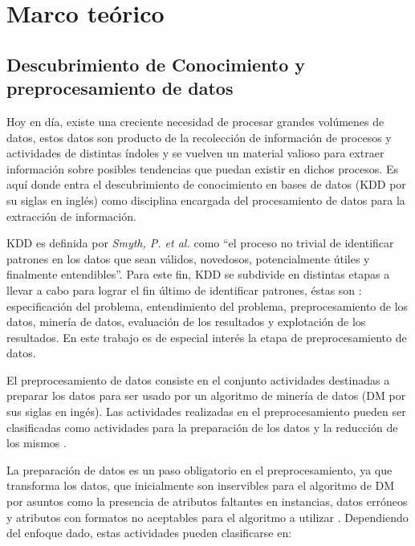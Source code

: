 \chapter{Marco teórico}
\label{capitulo1}

\section{Descubrimiento de Conocimiento y preprocesamiento de datos}

Hoy en día, existe una creciente necesidad de procesar grandes volúmenes de datos, estos datos son producto de la recolección de información de procesos y actividades de distintas índoles y se vuelven un material valioso para extraer información sobre posibles tendencias que puedan existir en dichos procesos. Es aquí donde entra el descubrimiento de conocimiento en bases de datos (KDD por su siglas en inglés) como disciplina encargada del procesamiento de datos para la extracción de información.

KDD es definida por \emph{Smyth, P. et al.} \cite{fayyd1996data} como ``el proceso no trivial de identificar patrones en los datos que sean válidos, novedosos, potencialmente útiles y finalmente entendibles''. Para este fin, KDD se subdivide en distintas etapas a llevar a cabo para lograr el fin último de identificar patrones, éstas son \cite{garcia2016data}: especificación del problema, entendimiento del problema, preprocesamiento de los datos, minería de datos, evaluación de los resultados y explotación de los resultados. En este trabajo es de especial interés la etapa de preprocesamiento de datos.

El preprocesamiento de datos consiste en el conjunto actividades destinadas a preparar los datos para ser usado por un algoritmo de minería de datos (DM por sus siglas en ingés). Las actividades realizadas en el preprocesamiento pueden ser clasificadas como actividades para la preparación de los datos y la reducción de los mismos \cite{garcia2016data}.

La preparación de datos es un paso obligatorio en el preprocesamiento, ya que transforma los datos, que inicialmente son inservibles para el algoritmo de DM por asuntos como la presencia de atributos faltantes en instancias, datos erróneos y atributos con formatos no aceptables para el algoritmo a utilizar \cite{garcia2016data}. Dependiendo del enfoque dado, estas actividades pueden clasificarse en:

